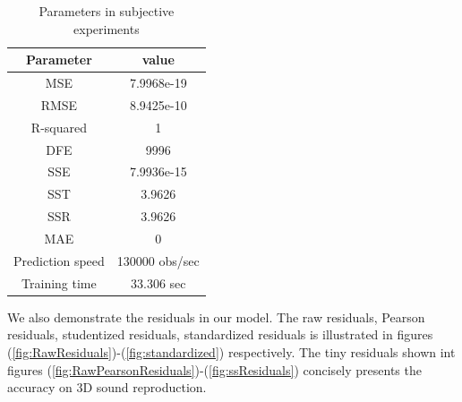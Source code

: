 \documentclass[runningheads,a4paper]{llncs}
\begin{document}
\begin{table}[htbp]
    \caption{\label{tab:parametersinRegression}Parameters in subjective experiments}
    \centering
    \begin{tabular}{|c | c|}
    \hline
    Parameter           & value                 \\
    \hline
    MSE                 & 7.9968e-19            \\
    RMSE                & 8.9425e-10            \\
    R-squared           & 1                     \\
    DFE                 & 9996                  \\
    SSE                 & 7.9936e-15            \\
    SST                 & 3.9626                \\
    SSR                 & 3.9626                \\
    MAE                 & 0                     \\
    Prediction speed    &   130000 obs/sec      \\
    Training time       &   33.306 sec          \\
    \hline
    \end{tabular}
    \end{table}


  We also demonstrate the residuals in our model. The raw residuals, Pearson residuals, studentized residuals, standardized residuals is illustrated in figures (\ref{fig:RawResiduals})-(\ref{fig:standardized}) respectively. The tiny residuals shown int figures (\ref{fig:RawPearsonResiduals})-(\ref{fig:ssResiduals}) concisely presents the accuracy on 3D sound reproduction.
\end{document}
